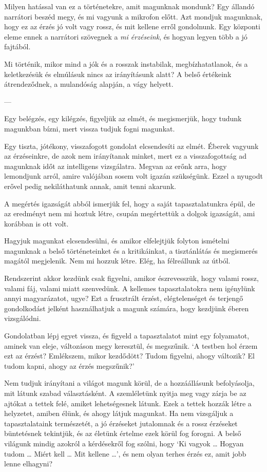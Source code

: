 Milyen hatással van ez a történetekre, amit magunknak mondunk? Egy
állandó narrátori beszéd megy, és mi vagyunk a mikrofon előtt. Azt
mondjuk magunknak, hogy ez az érzés jó volt vagy rossz, és mit kellene
erről gondolnunk. Egy központi eleme ennek a narrátori szövegnek a
\emph{mi érzéseink}, és hogyan legyen több a jó fajtából.

Mi történik, mikor mind a jók és a rosszak instabilak, megbízhatatlanok,
és a keletkezésük és elmúlásuk nincs az irányításunk alatt? A belső
értékeink átrendeződnek, a mulandóság alapján, a vágy helyett.

---

Egy belégzés, egy kilégzés, figyeljük az elmét, és megismerjük, hogy
tudunk magunkban bízni, mert vissza tudjuk fogni magunkat.

Egy tiszta, jótékony, visszafogott gondolat elcsendesíti az elmét.
Éberek vagyunk az érzéseinkre, de azok nem irányítanak minket, mert ez a
visszafogottság ad magunknak időt az intelligens vizsgálatra. Megvan az
erőnk arra, hogy lemondjunk arról, amire valójában sosem volt igazán
szükségünk. Ezzel a nyugodt erővel pedig nekiláthatunk annak, amit tenni
akarunk.

A megértés igazságát abból ismerjük fel, hogy a saját tapasztalatunkra
épül, de az eredményt nem mi hoztuk létre, csupán megértettük a dolgok
igazságát, ami korábban is ott volt.

Hagyjuk magunkat elcsendesülni, és amikor elfelejtjük folyton ismételni
magunknak a belső történeteinket és a kritikáinkat, a tisztánlátás és
megismerés magától megjelenik. Nem mi hozzuk létre. Elég, ha félreállunk
az útból.

Rendszerint akkor kezdünk csak figyelni, amikor észrevesszük, hogy
valami rossz, valami fáj, valami miatt szenvedünk. A kellemes
tapasztalatokra nem igénylünk annyi magyarázatot, ugye? Ezt a frusztrált
érzést, elégtelenséget és terjengő gondolkodást jelként használhatjuk a
magunk számára, hogy kezdjünk éberen vizsgálódni.

Gondolatban lépj egyet vissza, és figyeld a tapasztalatot mint egy
folyamatot, aminek van eleje, változáson megy keresztül, és megszűnik.
`A testben hol érzem ezt az érzést? Emlékszem, mikor kezdődött? Tudom
figyelni, ahogy változik? El tudom kapni, ahogy az érzés megszűnik?'

Nem tudjuk irányítani a világot magunk körül, de a hozzáállásunk
befolyásolja, mit látunk szabad választásként. A szemléletünk nyitja meg
vagy zárja be az ajtókat a tettek felé, amiket lehetségesnek látunk.
Ezek a tettek hozzák létre a helyzetet, amiben élünk, és ahogy látjuk
magunkat. Ha nem vizsgáljuk a tapasztalataink természetét, a jó
érzéseket jutalomnak és a rossz érzéseket büntetésnek tekintjük, és az
életünk értelme ezek körül fog forogni. A belső világunk mindig azokról
a kérdésekről fog szólni, hogy `Ki vagyok \ldots{} Hogyan tudom \ldots{}
Miért kell \ldots{} Mit kellene \ldots{}', és nem olyan terhes érzés ez,
amit jobb lenne elhagyni?


